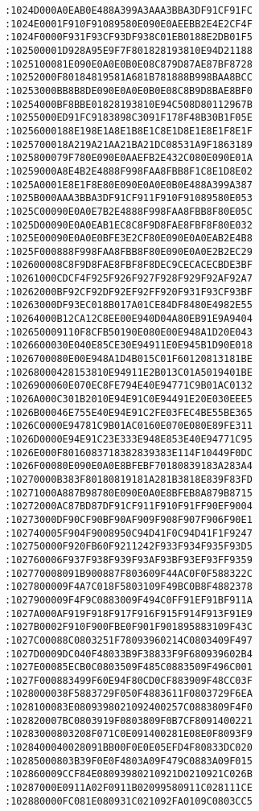 \begin{lstlisting}[language={}, basicstyle=\scriptsize, caption=Машинний код]
:1024D000A0EAB0E488A399A3AAA3BBA3DF91CF91FC
:1024E0001F910F91089580E090E0AEEBB2E4E2CF4F
:1024F0000F931F93CF93DF938C01EB0188E2DB01F5
:102500001D928A95E9F7F801828193810E94D21188
:1025100081E090E0A0E0B0E08C879D87AE87BF8728
:10252000F80184819581A681B781888B998BAA8BCC
:10253000BB8B8DE090E0A0E0B0E08C8B9D8BAE8BF0
:10254000BF8BBE01828193810E94C508D80112967B
:10255000ED91FC9183898C3091F178F48B30B1F05E
:10256000188E198E1A8E1B8E1C8E1D8E1E8E1F8E1F
:1025700018A219A21AA21BA21DC08531A9F1863189
:1025800079F780E090E0AAEFB2E432C080E090E01A
:10259000A8E4B2E4888F998FAA8FBB8F1C8E1D8E02
:1025A0001E8E1F8E80E090E0A0E0B0E488A399A387
:1025B000AAA3BBA3DF91CF911F910F91089580E053
:1025C00090E0A0E7B2E4888F998FAA8FBB8F80E05C
:1025D00090E0A0EAB1EC8C8F9D8FAE8FBF8F80E032
:1025E00090E0A0E0BFE3E2CF80E090E0A0EAB2E4B8
:1025F000888F998FAA8FBB8F80E090E0A0E2B2EC29
:102600008C8F9D8FAE8FBF8F8DEC9CECACECBDE3BF
:10261000CDCF4F925F926F927F928F929F92AF92A7
:10262000BF92CF92DF92EF92FF920F931F93CF93BF
:10263000DF93EC018B017A01CE84DF8480E4982E55
:10264000B12CA12C8EE00E940D04A80EB91E9A9404
:102650009110F8CFB50190E080E00E948A1D20E043
:1026600030E040E85CE30E94911E0E945B1D90E018
:1026700080E00E948A1D4B015C01F60120813181BE
:10268000428153810E94911E2B013C01A5019401BE
:1026900060E070EC8FE794E40E94771C9B01AC0132
:1026A000C301B2010E94E91C0E94491E20E030EEE5
:1026B00046E755E40E94E91C2FE03FEC4BE55BE365
:1026C0000E94781C9B01AC0160E070E080E89FE311
:1026D0000E94E91C23E333E948E853E40E94771C95
:1026E000F8016083718382839383E114F10449F0DC
:1026F00080E090E0A0E8BFEBF70180839183A283A4
:10270000B383F80180819181A281B3818E839F83FD
:10271000A887B98780E090E0A0E8BFEB8A879B8715
:10272000AC87BD87DF91CF911F910F91FF90EF9004
:10273000DF90CF90BF90AF909F908F907F906F90E1
:102740005F904F9008950C94D41F0C94D41F1F9247
:102750000F920FB60F9211242F933F934F935F93D5
:102760006F937F938F939F93AF93BF93EF93FF9359
:102770008091B900887F803609F44AC0F0F588322C
:1027800009F4A7C018F5803109F49BC0B8F4882378
:1027900009F4F9C0883009F494C0FF91EF91BF911A
:1027A000AF919F918F917F916F915F914F913F91E9
:1027B0002F910F900FBE0F901F901895883109F43C
:1027C00088C0803251F78093960214C0803409F497
:1027D0009DC040F48033B9F38833F9F680939602B4
:1027E00085ECB0C0803509F485C0883509F496C001
:1027F000883499F60E94F80CD0CF883909F48CC03F
:1028000038F5883729F050F4883611F0803729F6EA
:1028100083E0809398021092400257C0883809F4F0
:102820007BC0803919F0803809F0B7CF8091400221
:10283000803208F071C0E091400281E08E0F8093F9
:1028400040028091BB00F0E0E05EFD4F80833DC020
:10285000803B39F0E0F4803A09F479C0883A09F015
:102860009CCF84E08093980210921D0210921C026B
:10287000E0911A02F0911B02099580911C028111CE
:102880000FC081E080931C021092FA0109C0803CC5

\end{lstlisting}
